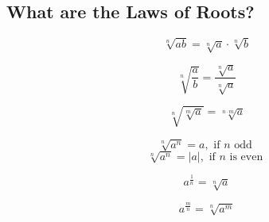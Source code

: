 \subsection{What are the Laws of Roots?}

$$
\sqrt[n]{ab} = \sqrt[n]{a} \cdot \sqrt[n]{b} 
$$

$$
\sqrt[n]{ \frac{a}{b} } = \frac{ \sqrt[n]{a} }{ \sqrt[n]{a} }
$$

$$
\sqrt[n]{ \sqrt[m]{a}} = \sqrt[n \cdot m]{a} 
$$

$$
\sqrt[n]{ a^{n} } = a, \text{ if } n \text{ odd }
$$
$$ 
\sqrt[n]{ a^{n} } = \lvert a \rvert, \text{ if } n \text{ is even }
$$

$$
a^{ \frac{1}{n} } = \sqrt[n]{a}
$$

$$
a^{ \frac{m}{n} } = \sqrt[n]{ a^{m} }
$$
